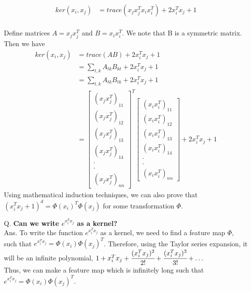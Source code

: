 \documentclass[11pt, twosides]{article}
\begin{document}
\begin{equation}
    \begin{split}
       ker(x_i, x_j) &= trace (x_jx_j^Tx_ix_i^T) + 2x_i^Tx_j+1\\
    \end{split}
\end{equation}

Define matrices $A= x_jx_j^T$ and $B= x_ix_i^T$. We note that B is a symmetric matrix. Then we have
\begin{equation}
    \begin{split}
        ker(x_i, x_j) &=trace(AB) +  2x_i^Tx_j+1\\
        & = \sum_{t,k} A_{tk}B_{kt} +  2x_i^Tx_j+1\\
        & = \sum_{t,k} A_{tk}B_{tk} +  2x_i^Tx_j+1\\
        & = {\begin{bmatrix}
(x_jx_j^T)_{11} \\
(x_jx_j^T)_{12} \\
(x_jx_j^T)_{13} \\
(x_jx_j^T)_{14} \\
\cdot\\
\cdot\\
(x_jx_j^T)_{nn} 
\end{bmatrix}}^T
\begin{bmatrix}
 (x_ix_i^T)_{11} \\
(x_ix_i^T)_{12}\\
 (x_ix_i^T)_{13}\\
 (x_ix_i^T)_{14}\\
 \cdot\\
\cdot\\
 (x_ix_i^T)_{nn}
\end{bmatrix} +  2x_i^Tx_j+1
    \end{split}
\end{equation}
\hfill \break
Using mathematical induction techniques, we can also prove that $(x_i^Tx_j+1)^d= \Phi(x_i)^T\Phi(x_j)$ for some transformation $\Phi$.

\begin{flushleft}
Q. \textbf{Can we write $e^{x_i^Tx_j}$ as  a kernel?}\\
Ans. \color{blue}
To write the function $e^{x_i^Tx_j}$ as a kernel, we need to find a feature map $\Phi$, such that $e^{x_i^Tx_j} = \Phi(x_i)\Phi(x_j)^T$.
Therefore, using the Taylor series expansion, it will be an infinite polynomial, $1 + x_i^Tx_j + \cfrac{(x_i^Tx_j)^2}{2!} + \cfrac{(x_i^Tx_j)^3}{3!} + \ldots$ \\ 
Thus, we can make a feature map which is infinitely long such that $e^{x_i^Tx_j} = \Phi(x_i)\Phi(x_j)^T$.
\end{flushleft}
\end{document}
